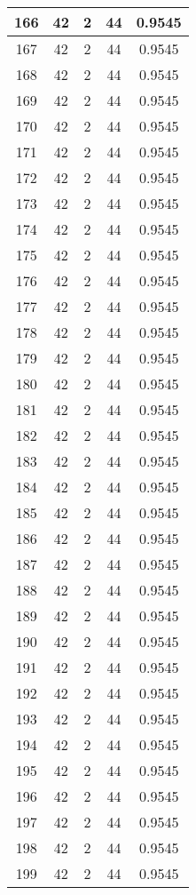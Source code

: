\documentclass[letterpaper, 12pt]{article}
\begin{document}
\begin{longtable}{|c|c|c|c|c|}
\hline
166 & 42 & 2 & 44 & 0.9545 \\
\hline
167 & 42 & 2 & 44 & 0.9545 \\
\hline
168 & 42 & 2 & 44 & 0.9545 \\
\hline
169 & 42 & 2 & 44 & 0.9545 \\
\hline
170 & 42 & 2 & 44 & 0.9545 \\
\hline
171 & 42 & 2 & 44 & 0.9545 \\
\hline
172 & 42 & 2 & 44 & 0.9545 \\
\hline
173 & 42 & 2 & 44 & 0.9545 \\
\hline
174 & 42 & 2 & 44 & 0.9545 \\
\hline
175 & 42 & 2 & 44 & 0.9545 \\
\hline
176 & 42 & 2 & 44 & 0.9545 \\
\hline
177 & 42 & 2 & 44 & 0.9545 \\
\hline
178 & 42 & 2 & 44 & 0.9545 \\
\hline
179 & 42 & 2 & 44 & 0.9545 \\
\hline
180 & 42 & 2 & 44 & 0.9545 \\
\hline
181 & 42 & 2 & 44 & 0.9545 \\
\hline
182 & 42 & 2 & 44 & 0.9545 \\
\hline
183 & 42 & 2 & 44 & 0.9545 \\
\hline
184 & 42 & 2 & 44 & 0.9545 \\
\hline
185 & 42 & 2 & 44 & 0.9545 \\
\hline
186 & 42 & 2 & 44 & 0.9545 \\
\hline
187 & 42 & 2 & 44 & 0.9545 \\
\hline
188 & 42 & 2 & 44 & 0.9545 \\
\hline
189 & 42 & 2 & 44 & 0.9545 \\
\hline
190 & 42 & 2 & 44 & 0.9545 \\
\hline
191 & 42 & 2 & 44 & 0.9545 \\
\hline
192 & 42 & 2 & 44 & 0.9545 \\
\hline
193 & 42 & 2 & 44 & 0.9545 \\
\hline
194 & 42 & 2 & 44 & 0.9545 \\
\hline
195 & 42 & 2 & 44 & 0.9545 \\
\hline
196 & 42 & 2 & 44 & 0.9545 \\
\hline
197 & 42 & 2 & 44 & 0.9545 \\
\hline
198 & 42 & 2 & 44 & 0.9545 \\
\hline
199 & 42 & 2 & 44 & 0.9545 \\
\hline
\end{longtable}
\end{document}
